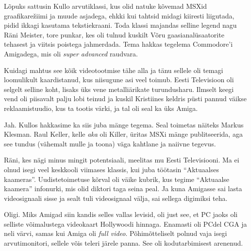 Lõpuks sattusin Kullo 
arvutiklassi, kus olid natuke kõvemad MSXid graafikarežiimi ja muude asjadega, ehkki kui 
tahtsid midagi kiiresti liigutada, pidid ikkagi kasutama tekstiekraani. Toda 
klassi majandas selline legend nagu Räni Meister, 
tore punkar, kes oli tulnud kuskilt Võru 
gaasianalüsaatorite tehasest ja viitsis poistega jahmerdada. Tema 
hakkas tegelema Commodore'i 
Amigadega, mis oli 
\emph{super advanced} raudvara. 

Kuidagi mahtus see kõik videotootmise tähe alla ja tänu 
sellele oli temagi loomulikult kaardistanud, kus niisugune asi veel toimub. 
Eesti Televisioon oli selgelt 
selline koht, lisaks üks vene metalliärikate turundusharu. Ilmselt keegi 
vend oli piisavalt palju lobi teinud ja kuskil Kristiines keldris püsti 
pannud väikse reklaamistuudio, kus ta tootis värki, ja tal oli 
seal ka üks Amiga. 


Jah. Kullos hakkasime ka siis juba mänge tegema. Seal toimetas näiteks Markus 
Klesman. Raul 
Keller, kelle \emph{aka} oli 
Killer, üritas MSXi mänge 
publitseerida, aga see tundus (vähemalt mulle ja toona) väga 
kahtlane ja naiivne tegevus.

Räni, kes nägi minus mingit potentsiaali, 
meelitas mu Eesti Televisiooni. Ma ei olnud isegi veel keskkooli viimases klassis, 
kui juba töötasin \enquote{Aktuaalses kaameras}. Uudistetoimetuse kõrval oli 
väike kubrik, kus tegime \enquote{Aktuaalse kaamera} infonurki, mis olid diktori 
taga seina peal. Ja kuna Amigasse 
sai lasta videosignaali sisse ja sealt tuli videosignaal välja, sai 
sellega digimiksi teha. 


Oligi. Miks Amigad siin kandis selles vallas levisid, oli just see, et PC 
jaoks oli selliste võimalustega videokaart Hollywoodi hinnaga. Enamasti oli 
PCdel 
CGA ja neli värvi, samas kui 
Amiga oli \emph{full video}. Põhimõtteliselt polnud 
vaja isegi arvutimonitori, sellele võis teleri järele panna. See oli 
kodutarbimisest arenenud. 

